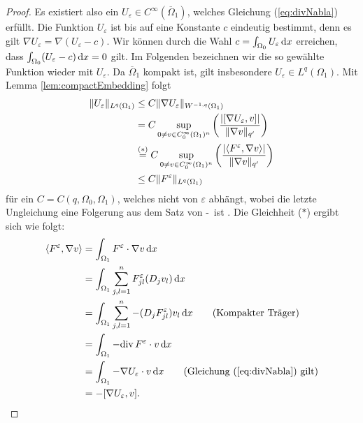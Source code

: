 \begin{proof}
  Es existiert also ein $U_\varepsilon \in C^\infty(\overline\Omega_1)$, welches Gleichung (\ref{eq:divNabla}) erfüllt.
  Die Funktion $U_\varepsilon$ ist bis auf eine Konstante $c$ eindeutig bestimmt, denn es gilt $\nabla U_\varepsilon = \nabla( U_\varepsilon - c)$.
  Wir können durch die Wahl $c = \int_{\Omega_0} U_\varepsilon \, {\operatorname{d}\!{x}}$ erreichen, dass $\int_{\Omega_0} (U_\varepsilon - c) \, {\operatorname{d}\!{x}} = 0$  gilt.
  Im Folgenden bezeichnen wir die so gewählte Funktion wieder mit $U_\varepsilon$.
  Da $\overline\Omega_1$ kompakt ist, gilt insbesondere $U_\varepsilon \in L^q(\Omega_1)$.
  Mit Lemma \ref{lem:compactEmbedding} folgt
  \begingroup
  \addtolength{\jot}{1em}
  \begin{align}
    \lVert U_\varepsilon \rVert_{L^q(\Omega_1)}
    &\leq C \lVert  \nabla U_\varepsilon  \rVert_{W^{-1,q}(\Omega_1)} \nonumber\\
    &= C \sup_{0 \neq v \in C_0^\infty(\Omega_1)^n} \left(\frac{|[\nabla U_\varepsilon, v]|}{\lVert \nabla v \rVert_{q'}} \right) \nonumber\\
    &\overset{(\ast)}{=} C \sup_{0 \neq v \in C_0^\infty(\Omega_1)^n} \left( \frac{|\langle F^\varepsilon, \nabla v \rangle|}{\lVert \nabla v \rVert_{q'}}\right) \nonumber\\
    &\leq C \lVert F^\varepsilon \rVert_{L^q(\Omega_1)} 
    \label{eq:inequalityUEpsilon}
  \end{align}
  \endgroup
  für ein $C = C(q,\Omega_0,\Omega_1)$, welches nicht von $\varepsilon$ abhängt, wobei die letzte Ungleichung eine Folgerung aus dem Satz von \hahn\hyp\banach\ ist \cite[S.98, Korollar III.1.7]{werner2011fa}.
  Die Gleichheit ($\ast$) ergibt sich wie folgt:
  \begin{align*}
    \langle F^\varepsilon, \nabla v \rangle
    &= \int_{\Omega_1} F^\varepsilon \cdot \nabla v \d x \\
    &= \int_{\Omega_1} \sum_{j,l=1}^n F_{jl}^\varepsilon (D_j v_l) \d x \\
    &= \int_{\Omega_1} \sum_{j,l=1}^n -(D_jF_{jl}^\varepsilon) v_l \d x \tag{Kompakter Träger}\\
    &= \int_{\Omega_1} -\div F^\varepsilon \cdot v \d x \\
    &= \int_{\Omega_1} -\nabla U_\varepsilon \cdot v \d x \tag{Gleichung (\ref{eq:divNabla}) gilt}\\
    &= -[\nabla U_\varepsilon, v].
  \end{align*}


\end{proof}
